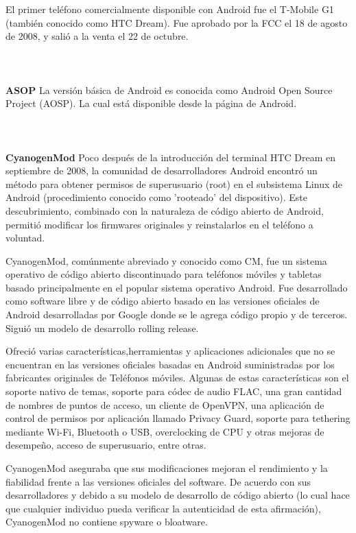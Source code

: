 El primer teléfono comercialmente disponible con Android fue el T-Mobile G1 (también conocido como HTC Dream). Fue aprobado por la FCC el 18 de agosto de 2008, y salió a la venta el 22 de octubre.
\\
\\
\\
\\
{\bf ASOP}
La versión básica de Android es conocida como Android Open Source Project (AOSP). La cual está disponible desde la página de Android.
\\
\\
\\
\\
{\bf CyanogenMod}
Poco después de la introducción del terminal HTC Dream en septiembre de 2008, la comunidad de desarrolladores Android encontró un método para obtener permisos de superusuario (root) en el subsistema Linux de Android (procedimiento conocido como 'rooteado' del dispositivo). Este descubrimiento, combinado con la naturaleza de código abierto de Android, permitió modificar los firmwares originales y reinstalarlos en el teléfono a voluntad. 

CyanogenMod, comúnmente abreviado y conocido como CM, fue un sistema operativo de código abierto discontinuado para teléfonos móviles y tabletas basado principalmente en el popular sistema operativo Android. Fue desarrollado como software libre y de código abierto basado en las versiones oficiales de Android desarrolladas por Google donde se le agrega código propio y de terceros. Siguió un modelo de desarrollo rolling release.

Ofreció varias características,herramientas y aplicaciones adicionales que no se encuentran en las versiones oficiales basadas en Android suministradas por los fabricantes originales de Teléfonos móviles. Algunas de estas características son el soporte nativo de temas, soporte para códec de audio FLAC, una gran cantidad de nombres de puntos de acceso, un cliente de OpenVPN, una aplicación de control de permisos por aplicación llamado Privacy Guard, soporte para tethering mediante Wi-Fi, Bluetooth o USB, overclocking de CPU y otras mejoras de desempeño, acceso de superusuario, entre otras.

CyanogenMod aseguraba que sus modificaciones mejoran el rendimiento y la fiabilidad frente a las versiones oficiales del software. De acuerdo con sus desarrolladores y debido a su modelo de desarrollo de código abierto (lo cual hace que cualquier individuo pueda verificar la autenticidad de esta afirmación), CyanogenMod no contiene spyware o bloatware.

